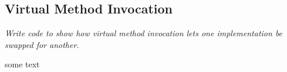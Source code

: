 \subsection{Virtual Method Invocation}
\textit{Write code to show how virtual method invocation lets one implementation be swapped for another.}

some text

